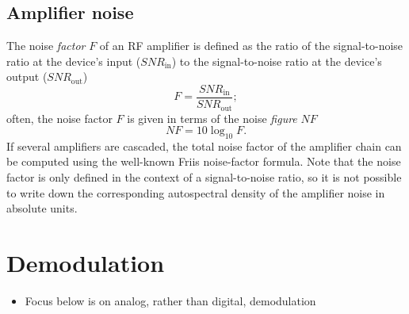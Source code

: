 \subsection{Amplifier noise}
The noise \emph{factor} $F$ of an RF amplifier is defined as the ratio of
the signal-to-noise ratio at the device's input ($SNR_{\text{in}}$) to
the signal-to-noise ratio at the device's output ($SNR_{\text{out}}$)
\begin{equation}
  F = \frac{SNR_{\text{in}}}{SNR_{\text{out}}};
\end{equation}
often, the noise factor $F$ is given
in terms of the noise \emph{figure} $NF$
\cite{minicircuits_amplifier_terms_defined}
\begin{equation}
  NF = 10 \log_{10} F.
\end{equation}
If several amplifiers are cascaded,
the total noise factor of the amplifier chain
can be computed using the well-known Friis noise-factor formula.
Note that the noise factor is only defined
in the context of a signal-to-noise ratio, so
it is not possible to write down the corresponding
autospectral density of the amplifier noise in absolute units.


\section{Demodulation}
\label{sec:DesignConsiderations:demodulation}
\begin{itemize}
  \item Focus below is on analog, rather than digital, demodulation
\end{itemize}


